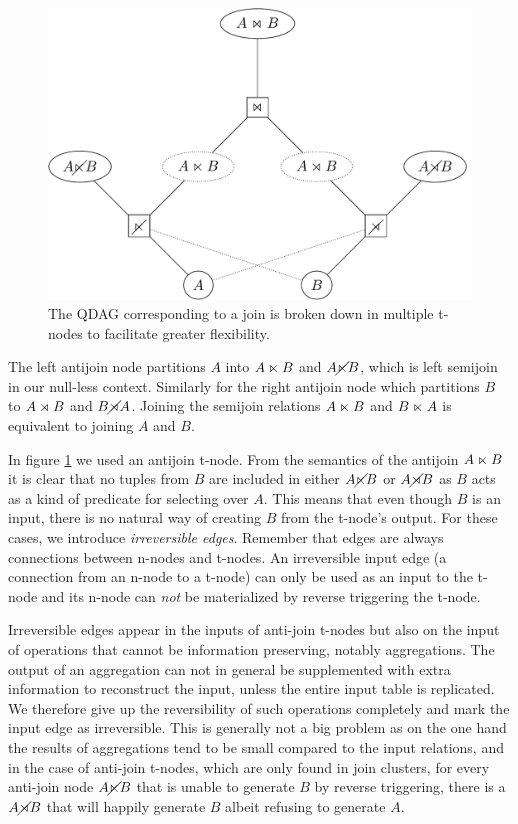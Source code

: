 \begin{figure}[H]
  \centering \includegraphics[width=.9\linewidth]{./imgs/joinnet.pdf}
  \caption{\label{fig:joinnet}The QDAG corresponding to a join is
    broken down in multiple t-nodes to facilitate greater
    flexibility.}
\end{figure}

The left antijoin node partitions \(A\) into \(A \ltimes B\) and
\(A \cancel\ltimes B\), which is left semijoin in our null-less
context. Similarly for the right antijoin node which partitions \(B\)
to \(A \rtimes B\) and \(B \cancel\rtimes A\). Joining the semijoin relations
\(A \ltimes B\) and \(B \ltimes A\) is equivalent to joining \(A\) and
\(B\).

In figure \ref{fig:joinnet} we used an antijoin t-node. From the
semantics of the antijoin \(A \ltimes B\) it is clear that no tuples
from \(B\) are included in either \(A \cancel\ltimes B\) or \(A \cancel\rtimes B\)
as \(B\) acts as a kind of predicate for selecting over \(A\). This
means that even though \(B\) is an input, there is no natural way of
creating \(B\) from the t-node's output. For these cases, we introduce
\emph{irreversible edges}. Remember that edges are always connections
between n-nodes and t-nodes. An irreversible input edge (a connection
from an n-node to a t-node) can only be used as an input to the t-node
and its n-node can \emph{not} be materialized by reverse triggering the
t-node.

Irreversible edges appear in the inputs of anti-join t-nodes but also
on the input of operations that cannot be information preserving,
notably aggregations. The output of an aggregation can not in general
be supplemented with extra information to reconstruct the input,
unless the entire input table is replicated. We therefore give up the
reversibility of such operations completely and mark the input edge as
irreversible. This is generally not a big problem as on the one hand
the results of aggregations tend to be small compared to the input
relations, and in the case of anti-join t-nodes, which are only found
in join clusters, for every anti-join node \(A \cancel\ltimes B\) that is
unable to generate \(B\) by reverse triggering, there is a \(A \cancel\rtimes
B\) that will happily generate \(B\) albeit refusing to generate
\(A\).

